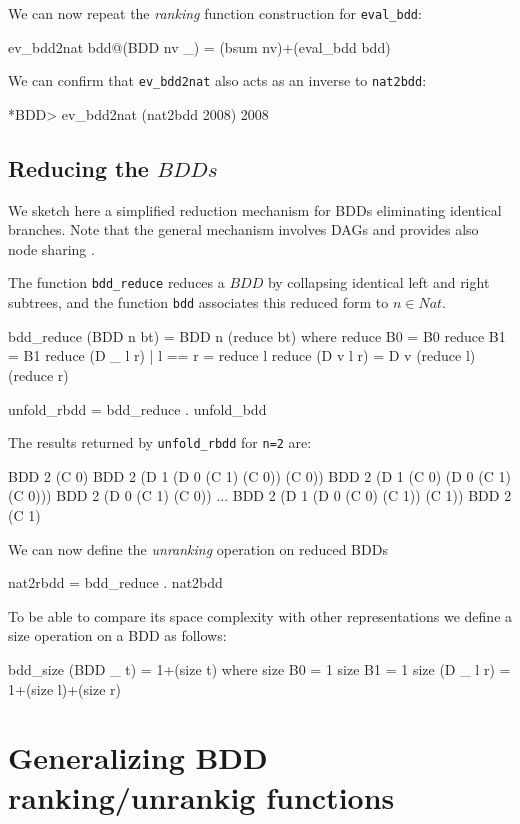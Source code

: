 \documentclass[]{INCLUDES/llncs}
\begin{document}
We can now repeat the {\em ranking} function construction for {\tt eval\_bdd}:
\begin{code}
ev_bdd2nat bdd@(BDD nv _) = (bsum nv)+(eval_bdd bdd)
\end{code}
We can confirm that {\tt ev\_bdd2nat} also acts as an inverse to
{\tt nat2bdd}:
\begin{codex}
*BDD> ev_bdd2nat (nat2bdd 2008)
2008
\end{codex}

\subsection{Reducing the $BDDs$}
We sketch here a simplified reduction mechanism for BDDs
eliminating identical branches. Note that the general
mechanism involves DAGs and provides also node sharing
\cite{bryant86graphbased}.

The function {\tt bdd\_reduce} reduces a $BDD$ by collapsing identical 
left and right subtrees, and the function {\tt bdd} 
associates this reduced form to $n \in Nat$.
\begin{code}
bdd_reduce (BDD n bt) = BDD n (reduce bt) where
  reduce B0 = B0
  reduce B1 = B1
  reduce (D _ l r) | l == r = reduce l
  reduce (D v l r) = D v (reduce l) (reduce r)

unfold_rbdd = bdd_reduce . unfold_bdd  
\end{code}

The results returned by {\tt unfold\_rbdd} for {\tt n=2} are:
\begin{codex}
  BDD 2 (C 0)
  BDD 2 (D 1 (D 0 (C 1) (C 0)) (C 0))
  BDD 2 (D 1 (C 0) (D 0 (C 1) (C 0)))
  BDD 2 (D 0 (C 1) (C 0))
  ...
  BDD 2 (D 1 (D 0 (C 0) (C 1)) (C 1))
  BDD 2 (C 1)
\end{codex}
We can now define the {\em unranking} operation on reduced BDDs
\begin{code}
nat2rbdd = bdd_reduce . nat2bdd 
\end{code}

To be able to compare its space complexity
with other representations we define 
a size operation on a BDD as follows:
\begin{code}
bdd_size (BDD _ t) = 1+(size t) where
  size B0 = 1
  size B1 = 1
  size (D _ l r) = 1+(size l)+(size r)
\end{code}

\section{Generalizing BDD ranking/unrankig functions} \label{gen}
\end{document}
